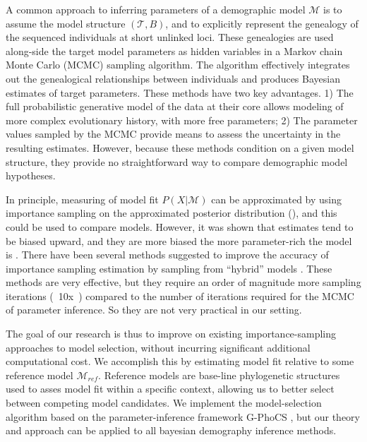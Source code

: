 \documentclass[11pt]{article}
\newcommand{\M}{\mathcal{M}}
\newcommand{\Tr}{\mathcal{T}}
\newcommand{\Mref}{\M_{ref}}
\newcommand{\1}{\mathbbm{1}}
\newcommand{\gp}{G-PhoCS }
\begin{document}
A common approach to inferring parameters of a demographic model $\M$ is to assume the model structure $(\Tr,B)$, and to explicitly represent the genealogy of the sequenced individuals at short unlinked loci.
%
These genealogies are used along-side the target model parameters as hidden variables in a Markov chain Monte Carlo (MCMC) sampling algorithm. 
%
The algorithm effectively integrates out the genealogical relationships between individuals and produces Bayesian estimates of target parameters.
%
These methods have two key advantages. 1) The full probabilistic generative model of the data at their core allows modeling of more complex evolutionary history, with more free parameters; 2) The parameter values sampled by the MCMC provide means to assess the uncertainty in the resulting estimates.
%
However, because these methods condition on a given model structure, they provide no straightforward way to compare demographic model hypotheses.


In principle, measuring of model fit $P(X|\M)$ can be approximated by using importance sampling on the approximated posterior distribution (\cite{NEWTRAFT94}), and this could be used to compare models.
%
However, it was shown that estimates tend to be biased upward, and they are more biased the more parameter-rich the model is \citep{XIEETAL11}. 
%
There have been several methods suggested to improve the accuracy of importance sampling estimation by sampling from ``hybrid'' models \citep{LARTPHIL06,XIEETAL11}.
%
These methods are very effective, but they require an order of magnitude more sampling iterations (~10x~) compared to the number of iterations required for the MCMC of parameter inference. So they are not very practical in our setting.


The goal of our research is thus to improve on existing importance-sampling approaches to model selection, without incurring significant additional computational cost.
%
We accomplish this by estimating model fit relative to some reference model $\Mref$. Reference models are base-line phylogenetic structures used to asses model fit within a specific context, allowing us to better select between competing model candidates.
%
We implement the model-selection algorithm based on the parameter-inference framework \gp, but our theory and approach can be applied to all bayesian demography inference methods.
\end{document}
